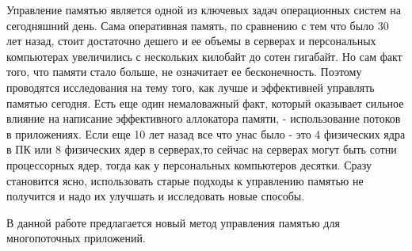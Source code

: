 \Introduction

Управление памятью является одной из ключевых задач операционных систем на сегодняшний день. Сама оперативная память, по сравнению с тем что было 30 лет назад,  стоит достаточно  дешего и ее объемы в серверах и персональных компьютерах   увеличились с нескольких килобайт до сотен гигабайт. Но сам факт   того, что памяти стало больше, не означитает ее бесконечность. Поэтому проводятся исследования на тему того, как лучше и эффективней управлять памятью   сегодня. Есть еще один немаловажный факт, который оказывает  сильное влияние на написание эффективного аллокатора памяти, - использование потоков в приложениях. Если еще 10 лет назад все что унас было - это 4 физических ядра в ПК или 8 физических ядер в серверах,то сейчас на серверах могут быть сотни процессорных ядер, тогда как у персональных компьютеров десятки. Сразу становится ясно, использовать старые подходы к управлению памятью не получится и надо их улучшать и исследовать новые способы.

В данной работе предлагается новый метод управления памятью для многопоточных приложений.